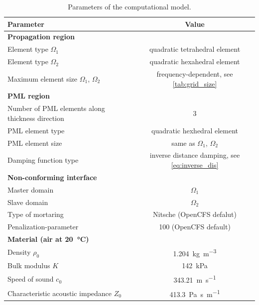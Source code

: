 \begin{table}
	\centering
	\caption{Parameters of the computational model.}
	\label{tab:model_parameters}
	\begin{tabular}{lc}
		\toprule
		Parameter & Value \\
		\midrule
		\textbf{Propagation region} & \\
		Element type $\Omega_1$ & quadratic tetrahedral element \\
		Element type $\Omega_2$ & quadratic hexahedral element \\
		Maximum element size $\Omega_1$, $\Omega_2$ & frequency-dependent, see \cref{tab:grid_size}\\
		\textbf{PML region} & \\
		Number of PML elements along thickness direction & 3 \\
		PML element type & quadratic hexhedral element \\
		PML element size & same as $\Omega_1$, $\Omega_2$\\
		Damping function type & inverse distance damping, see \cref{eq:inverse_dis} \\
		\textbf{Non-conforming interface} & \\
		Master domain & $\Omega_1$ \\
		Slave domain & $\Omega_2$ \\
		Type of mortaring & Nitsche (OpenCFS defalut) \\
		Penalization-parameter & 100 (OpenCFS default) \\
		\textbf{Material (air at \SI{20}{\degreeCelsius})} & \\
		Density $\rho_0$ & \SI{1.204}{\kilogram\per\cubic\meter} \\
		Bulk modulus $K$ & \SI{142}{\kilo\pascal} \\
		Speed of sound $c_0$ & \SI{343.21}{\meter\per\second} \\
		Characteristic acoustic impedance $Z_0$ & \SI{413.3}{\pascal\second\per\meter}  \\
		\bottomrule
	\end{tabular}
\end{table}

